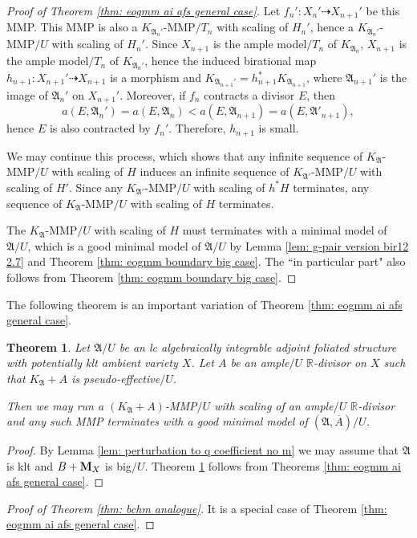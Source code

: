 \documentclass[12pt]{amsart}
\numberwithin{equation}{section}
\newcommand{\Mm}{{\bf{M}}}
\newcommand{\Rr}{\mathbb{R}}
\newcommand{\Aa}{{\mathfrak{A}}}
\newtheorem{thm}{Theorem}[section]
\theoremstyle{definition}
\theoremstyle{definition}
\theoremstyle{definition}
\begin{document}
\begin{proof}[Proof of Theorem \ref{thm: eogmm ai afs general case}]
Let $f_n': X_n'\dashrightarrow X_{n+1}'$ be this MMP. This MMP is also a $K_{\Aa_n'}$-MMP$/T_n$ with scaling of $H_n'$, hence a $K_{\Aa_n'}$-MMP$/U$ with scaling of $H_n'$. Since $X_{n+1}$ is the ample model$/T_n$ of $K_{\Aa_n}$,  $X_{n+1}$ is the ample model$/T_n$ of $K_{\Aa_n'}$, hence the induced birational map $h_{n+1}: X_{n+1}'\dashrightarrow X_{n+1}$ is a morphism and $K_{\Aa_{n+1}'}=h_{n+1}^*K_{\Aa_{n+1}}$, where $\Aa_{n+1}'$ is the image of $\Aa_{n}'$ on $X_{n+1}'$. Moreover, if $f_n$ contracts a divisor $E$, then
$$a(E,\Aa_n')=a(E,\Aa_n)<a(E,\Aa_{n+1})=a(E,\Aa'_{n+1}),$$
hence $E$ is also contracted by $f_n'$. Therefore, $h_{n+1}$ is small.

We may continue this process, which shows that any infinite sequence of $K_{\Aa}$-MMP$/U$ with scaling of $H$ induces an infinite sequence of $K_{\Aa'}$-MMP$/U$ with scaling of $H'$. Since any $K_{\Aa'}$-MMP$/U$ with scaling of $h^*H$ terminates, any  sequence of $K_{\Aa}$-MMP$/U$ with scaling of $H$ terminates.

The $K_{\Aa}$-MMP$/U$ with scaling of $H$ must terminates with a minimal model of $\Aa/U$, which is a good minimal model of $\Aa/U$ by Lemma \ref{lem: g-pair version bir12 2.7} and Theorem \ref{thm: eogmm boundary big case}. The ``in particular part" also follows from Theorem \ref{thm: eogmm boundary big case}.
\end{proof}

The following theorem is an important variation of Theorem \ref{thm: eogmm ai afs general case}.

\begin{thm}\label{thm: eogmm ai afs +a case}
    Let $\Aa/U$ be an lc algebraically integrable adjoint foliated structure with potentially klt ambient variety $X$. Let $A$ be an ample$/U$ $\Rr$-divisor on $X$ such that $K_{\Aa}+A$ is pseudo-effective$/U$.

    Then we may run a $(K_{\Aa}+A)$-MMP$/U$ with scaling of an ample$/U$ $\Rr$-divisor and any such MMP terminates with a good minimal model of $(\Aa,\overline{A})/U$.
\end{thm}
\begin{proof}
    By Lemma \ref{lem: perturbation to q coefficient no m} we may assume that $\Aa$ is klt and $B+\Mm_X$ is big$/U$. Theorem \ref{thm: eogmm ai afs +a case} follows from Theorems \ref{thm: eogmm ai afs general case}.
\end{proof}

\begin{proof}[Proof of Theorem \ref{thm: bchm analogue}]
 It is a special case of Theorem \ref{thm: eogmm ai afs general case}.
\end{proof}
\end{document}
